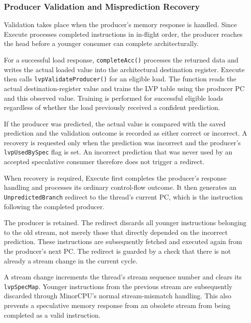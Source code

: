 \subsubsection{Producer Validation and Misprediction Recovery}

Validation takes place when the producer's memory response is
handled. Since Execute processes completed instructions in
in-flight order, the producer reaches the head before a younger
consumer can complete architecturally.

For a successful load response, \texttt{completeAcc()} processes
the returned data and writes the actual loaded value into the
architectural destination register. Execute then calls
\texttt{lvpValidate\allowbreak Producer()} for an eligible load. The function
reads the actual destination-register value and trains the LVP
table using the producer PC and this observed value. Training is
performed for successful eligible loads regardless of whether
the load previously received a confident prediction.

If the producer was predicted, the actual value is compared with
the saved prediction and the validation outcome is recorded as
either correct or incorrect. A recovery is requested only when
the prediction was incorrect and the producer's
\texttt{lvpUsedBySpec} flag is set. An incorrect prediction that
was never used by an accepted speculative consumer therefore
does not trigger a redirect.

When recovery is required, Execute first completes the producer's
response handling and processes its ordinary control-flow outcome.
It then generates an \texttt{UnpredictedBranch} redirect to the
thread's current PC, which is the instruction following the
completed producer.

The producer is retained. The redirect discards all younger
instructions belonging to the old stream, not merely those
that directly depended on the incorrect prediction. These
instructions are subsequently fetched and executed again
from the producer's next PC. The redirect is guarded by a check
that there is not already a stream change in the current cycle.

A stream change increments the thread's stream sequence number
and clears its \texttt{lvpSpecMap}. Younger instructions from the
previous stream are subsequently discarded through MinorCPU's
normal stream-mismatch handling. This also prevents a speculative
memory response from an obsolete stream from being completed as
a valid instruction.

